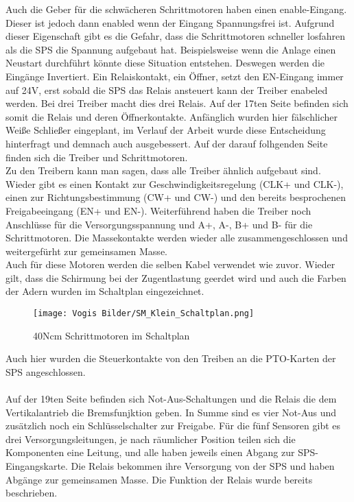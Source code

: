     Auch die Geber für die schwächeren Schrittmotoren haben einen enable-Eingang. Dieser ist jedoch dann enabled wenn der Eingang Spannungsfrei ist. Aufgrund dieser Eigenschaft gibt es die Gefahr, dass die Schrittmotoren schneller losfahren als die SPS die Spannung aufgebaut hat. Beispielsweise wenn die Anlage einen Neustart durchführt könnte diese Situation entstehen. Deswegen werden die Eingänge Invertiert. Ein Relaiskontakt, ein Öffner, setzt den EN-Eingang immer auf 24V, erst sobald die SPS das Relais ansteuert kann der Treiber enabeled werden. Bei drei Treiber macht dies drei Relais. Auf der 17ten Seite befinden sich somit die Relais und deren Öffnerkontakte. Anfänglich wurden hier fälschlicher Weiße Schließer eingeplant, im Verlauf der Arbeit wurde diese Entscheidung hinterfragt und demnach auch ausgebessert. Auf der darauf folhgenden Seite finden sich die Treiber und Schrittmotoren.\\
    Zu den Treibern kann man sagen, dass alle Treiber ähnlich aufgebaut sind. Wieder gibt es einen Kontakt zur Geschwindigkeitsregelung (CLK+ und CLK-), einen zur Richtungsbestimmung (CW+ und CW-) und den bereits besprochenen Freigabeeingang (EN+ und EN-). Weiterführend haben die Treiber noch Anschlüsse für die Versorgungsspannung und A+, A-, B+ und B- für die Schrittmotoren. Die Massekontakte werden wieder alle zusammengeschlossen und weitergefürht zur gemeinsamen Masse.\\ 
    Auch für diese Motoren werden die selben Kabel verwendet wie zuvor. Wieder gilt, dass die Schirmung bei der Zugentlastung geerdet wird und auch die Farben der Adern wurden im Schaltplan eingezeichnet.\\
    \begin{figure}[h]
        \centering
        \texttt{[image: Vogis Bilder/SM\_Klein\_Schaltplan.png]}
        \caption{40Ncm Schrittmotoren im Schaltplan}
        \label{fig:SMkleine}
    \end{figure}
    Auch hier wurden die Steuerkontakte von den Treiben an die PTO-Karten der SPS angeschlossen.\\\\
    Auf der 19ten Seite befinden sich Not-Aus-Schaltungen und die Relais die dem Vertikalantrieb die Bremsfunjktion geben. In Summe sind es vier Not-Aus und zusätzlich noch ein Schlüsselschalter zur Freigabe. Für die fünf Sensoren gibt es drei Versorgungsleitungen, je nach räumlicher Position teilen sich die Komponenten eine Leitung, und alle haben jeweils einen Abgang zur SPS-Eingangskarte. Die Relais bekommen ihre Versorgung von der SPS und haben Abgänge zur gemeinsamen Masse. Die Funktion der Relais wurde bereits beschrieben.\\\\ 

